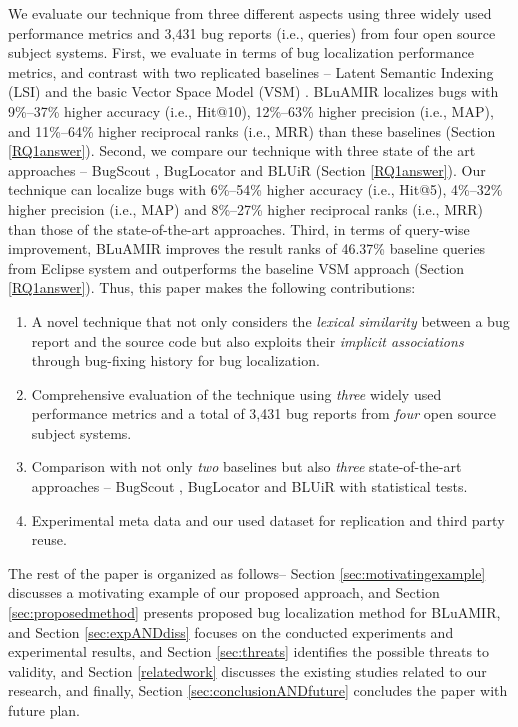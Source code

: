 \documentclass[sigconf,review,anonymous]{acmart}
\begin{document}
We evaluate our technique from three different aspects using
three widely used performance metrics and 3,431 bug reports (i.e.,
queries) from four open source subject systems. 
First, we evaluate in terms of bug localization performance metrics, and contrast with two replicated baselines -- Latent Semantic Indexing (LSI) \cite{MarcusLSI} and the basic Vector Space Model (VSM) \cite{vector-space-model}.
BLuAMIR localizes bugs with 9\%--37\% higher accuracy (i.e., Hit@10), 12\%--63\% higher precision (i.e., MAP), and 11\%--64\% higher reciprocal ranks (i.e., MRR) than these baselines (Section  \ref{RQ1answer}).
Second, we compare our technique with three state of the art approaches -- BugScout \cite{Nguyen}, BugLocator \cite{Jian} and BLUiR \cite{Saha} (Section \ref{RQ1answer}).
Our technique can localize bugs with 6\%--54\% higher accuracy (i.e., Hit@5), 4\%--32\% higher precision (i.e., MAP) and 8\%--27\% higher reciprocal ranks (i.e., MRR) than those of the state-of-the-art approaches.
Third, in terms of query-wise improvement, BLuAMIR improves the result ranks of 46.37\% baseline queries from Eclipse system and outperforms the baseline VSM approach (Section \ref{RQ1answer}).
Thus, this paper makes the following contributions:
\begin{enumerate}[noitemsep,topsep=0pt]
	\item A novel technique that not only considers the \emph{lexical similarity} between a bug report and the source code but also exploits their \emph{implicit associations} through bug-fixing history for bug localization.
	\item Comprehensive evaluation of the technique using \emph{three} widely used performance metrics and a total of 3,431 bug reports from \emph{four} open source subject systems.
	\item Comparison with not only \emph{two} baselines \cite{vector-space-model,MarcusLSI} but also \emph{three} state-of-the-art approaches -- BugScout \cite{Nguyen}, BugLocator \cite{Jian} and BLUiR \cite{Saha} with statistical tests.
	\item Experimental meta data and our used dataset for  replication and third party reuse.
\end{enumerate}

The rest of the paper is organized as follows-- Section \ref{sec:motivatingexample} discusses a motivating example of our proposed approach, and Section \ref{sec:proposedmethod} presents proposed bug localization method for BLuAMIR, and Section \ref{sec:expANDdiss} focuses on the conducted experiments and experimental results, and Section \ref{sec:threats} identifies the possible threats to validity, and Section \ref{relatedwork}
discusses the existing studies related to our research, and finally,  
Section \ref{sec:conclusionANDfuture} concludes the paper with future plan.
\end{document}
